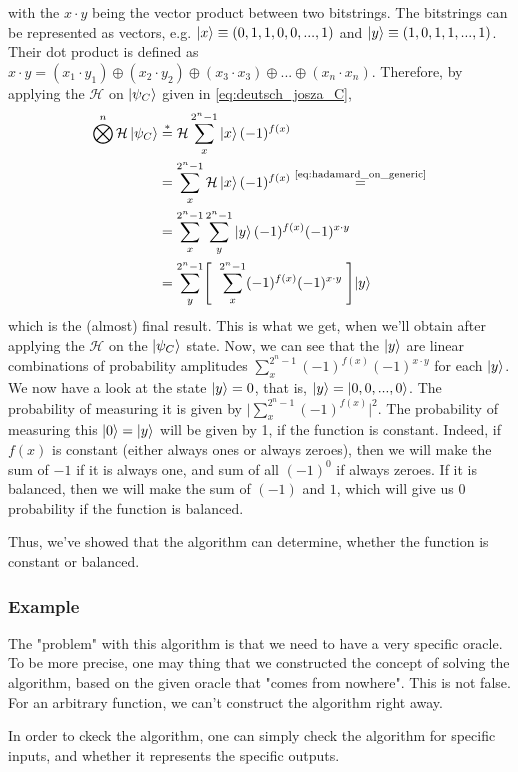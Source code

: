 with the $x \cdot y$ being the vector product between two bitstrings. The bitstrings can be represented as vectors, e.g. $\ket{x}\equiv (0,1,1,0,0,...,1)$ and 
$\ket{y}\equiv (1,0,1,1,...,1)$. Their dot product is defined as $x\cdot y = (x_1 \cdot y_1) \oplus (x_2 \cdot y_2) \oplus (x_3 \cdot x_3) \oplus ... \oplus (x_n \cdot x_n)$.
Therefore, by applying the $\mathcal{H}$ on $\ket{\psi_C}$ given in \autoref{eq:deutsch_josza_C},
\begin{align}
  \bigotimes ^n \mathcal{H} \ket{\psi_C} &\stackrel{*}{=} \mathcal{H} \sum_x^{2^n-1} \ket{x}(-1)^{f(x)} \\
                                         &= \sum_x^{2^n-1} \mathcal{H}\ket{x}(-1)^{f(x)} \stackrel{\text{\autoref{eq:hadamard_on_generic}}}{=} \\
                                         &= \sum_x^{2^n-1} \sum_y^{2^n-1} \ket{y} (-1)^{f(x)}(-1)^{x\cdot y} \\
                                         &= \sum_y^{2^n-1} \Biggl [\; \; \sum_x^{2^n-1} (-1)^{f(x)}(-1)^{x\cdot y} \; \Biggl ] \ket{y}
\end{align}
which is the (almost) final result. This is what we get, when we'll obtain after applying the $\mathcal{H}$ on the $\ket{\psi_C}$ state.
Now, we can see that the $\ket{y}$ are linear combinations of probability amplitudes $\sum_x^{2^n-1} (-1)^{f(x)}(-1)^{x\cdot y}$ for each 
$\ket{y}$. We now have a look at the state $\ket{y}=0$, that is, $\ket{y}=\ket{0,0,...,0}$. The probability of measuring it 
is given by $\bigg| \sum_x^{2^n-1} (-1)^{f(x)} \bigg|^2$. The probability of measuring this $\ket{0}=\ket{y}$ will be given by 1, if the function is constant.
Indeed, if $f(x)$ is constant (either always ones or always zeroes), then we will make the sum of $-1$ if it is always one, and sum of all $(-1)^0$ if always 
zeroes. If it is balanced, then we will make the sum of $(-1)$ and $1$, which will give us 0 probability if the function is balanced.

Thus, we've showed that the algorithm can determine, whether the function is constant or balanced.

\subsubsection*{Example}

The "problem" with this algorithm is that we need to have a very specific oracle. To be more precise, one may thing that we constructed the concept of 
solving the algorithm, based on the given oracle that "comes from nowhere". This is not false. For an arbitrary function, we can't construct the algorithm right 
away.


In order to ckeck the algorithm, one can simply check the algorithm for specific inputs, and whether it represents the specific outputs.



















